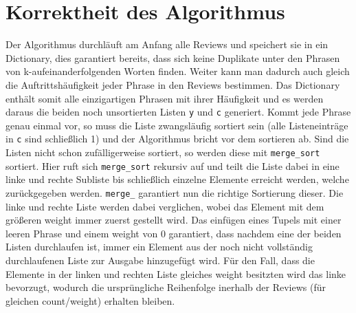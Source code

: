 \documentclass[ngerman]{scrartcl}
\newcommand{\code}{\texttt}
\begin{document}
\section{Korrektheit des Algorithmus}
\label{sec:correctness}
Der Algorithmus durchläuft am Anfang alle Reviews und speichert sie in ein Dictionary, dies garantiert bereits, dass sich keine Duplikate unter den Phrasen von k-aufeinanderfolgenden Worten finden. Weiter kann man dadurch auch gleich die Auftrittshäufigkeit jeder Phrase in den Reviews bestimmen. Das Dictionary enthält somit alle einzigartigen Phrasen mit ihrer Häufigkeit und es werden daraus die beiden noch unsortierten Listen \code{y} und \code{c} generiert. Kommt jede Phrase genau einmal vor, so muss die Liste zwangsläufig sortiert sein (alle Listeneinträge in \code{c} sind schließlich 1) und der Algorithmus bricht vor dem sortieren ab. Sind die Listen nicht schon zufälligerweise sortiert, so werden diese mit \code{merge\_sort} sortiert. Hier ruft sich \code{merge\_sort} rekursiv auf und teilt die Liste dabei in eine linke und rechte Subliste bis schließlich einzelne Elemente erreicht werden, welche zurückgegeben werden. \code{merge\_} garantiert nun die richtige Sortierung dieser. Die linke und rechte Liste werden dabei verglichen, wobei das Element mit dem größeren weight immer zuerst gestellt wird. Das einfügen eines Tupels mit einer leeren Phrase und einem weight von 0 garantiert, dass nachdem eine der beiden Listen durchlaufen ist, immer ein Element aus der noch nicht vollständig durchlaufenen Liste zur Ausgabe hinzugefügt wird. Für den Fall, dass die Elemente in der linken und rechten Liste gleiches weight besitzten wird das linke bevorzugt, wodurch die ursprüngliche Reihenfolge inerhalb der Reviews (für gleichen count/weight) erhalten bleiben. 


\clearpage


\end{document}
